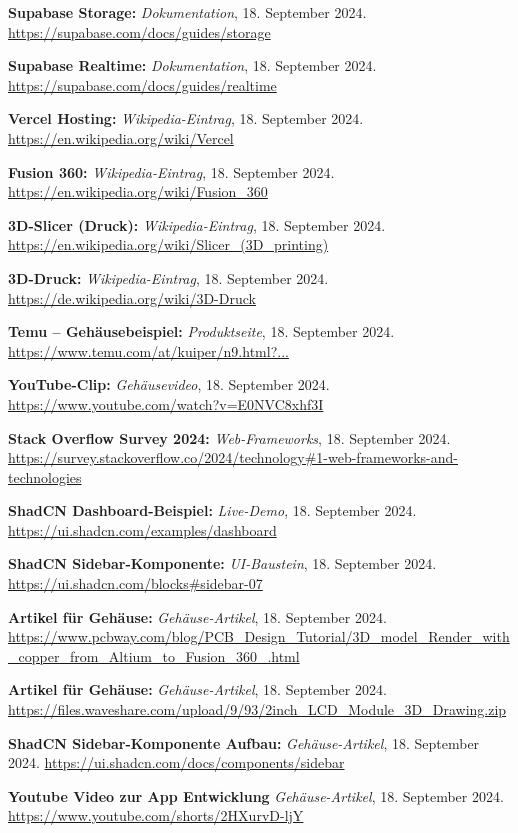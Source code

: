 \begin{thebibliography}{9999}
\textbf{Supabase Storage:} \textit{Dokumentation}, 18. September 2024.  
\url{https://supabase.com/docs/guides/storage}

\textbf{Supabase Realtime:} \textit{Dokumentation}, 18. September 2024.  
\url{https://supabase.com/docs/guides/realtime}

\textbf{Vercel Hosting:} \textit{Wikipedia-Eintrag}, 18. September 2024.  
\url{https://en.wikipedia.org/wiki/Vercel}

\textbf{Fusion 360:} \textit{Wikipedia-Eintrag}, 18. September 2024.  
\url{https://en.wikipedia.org/wiki/Fusion_360}

\textbf{3D-Slicer (Druck):} \textit{Wikipedia-Eintrag}, 18. September 2024.  
\url{https://en.wikipedia.org/wiki/Slicer_(3D_printing)}

\textbf{3D-Druck:} \textit{Wikipedia-Eintrag}, 18. September 2024.  
\url{https://de.wikipedia.org/wiki/3D-Druck}

\textbf{Temu – Gehäusebeispiel:} \textit{Produktseite}, 18. September 2024.  
\url{https://www.temu.com/at/kuiper/n9.html?...}

\textbf{YouTube-Clip:} \textit{Gehäusevideo}, 18. September 2024.  
\url{https://www.youtube.com/watch?v=E0NVC8xhf3I}

\textbf{Stack Overflow Survey 2024:} \textit{Web-Frameworks}, 18. September 2024.  
\url{https://survey.stackoverflow.co/2024/technology#1-web-frameworks-and-technologies}

\textbf{ShadCN Dashboard-Beispiel:} \textit{Live-Demo}, 18. September 2024.  
\url{https://ui.shadcn.com/examples/dashboard}

\textbf{ShadCN Sidebar-Komponente:} \textit{UI-Baustein}, 18. September 2024.  
\url{https://ui.shadcn.com/blocks#sidebar-07}

\textbf{Artikel für Gehäuse:} \textit{Gehäuse-Artikel}, 18. September 2024.  
\url{https://www.pcbway.com/blog/PCB_Design_Tutorial/3D_model_Render_with_copper_from_Altium_to_Fusion_360_.html}

\textbf{Artikel für Gehäuse:} \textit{Gehäuse-Artikel}, 18. September 2024.  
\url{https://files.waveshare.com/upload/9/93/2inch_LCD_Module_3D_Drawing.zip}

\textbf{ShadCN Sidebar-Komponente Aufbau:} \textit{Gehäuse-Artikel}, 18. September 2024.  
\url{https://ui.shadcn.com/docs/components/sidebar}

\textbf{Youtube Video zur App Entwicklung} \textit{Gehäuse-Artikel}, 18. September 2024.  
\url{https://www.youtube.com/shorts/2HXurvD-ljY}

\end{thebibliography}
